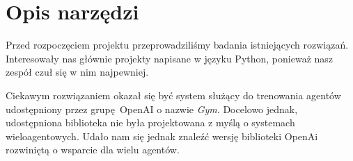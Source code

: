 \section{Opis narzędzi}
Przed rozpoczęciem projektu przeprowadziliśmy badania
istniejących rozwiązań. Interesowały nas głównie projekty
napisane w języku Python, ponieważ nasz zespół czuł się w nim
najpewniej.

Ciekawym rozwiązaniem okazał się być system służący do 
trenowania agentów udostępniony przez grupę OpenAI o nazwie
\textit{Gym}\cite{openai_gym}. Docelowo jednak, udostępniona biblioteka
nie była projektowana z myślą o systemach wieloagentowych.
Udało nam się jednak znaleźć wersję biblioteki OpenAi rozwiniętą
o wsparcie dla wielu agentów\cite{ma_gym}.
